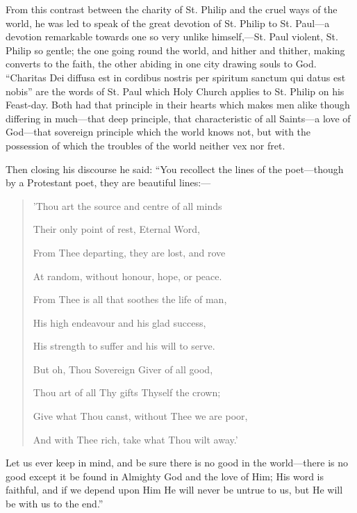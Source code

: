 From this contrast between the charity of St. Philip and the cruel
ways of the world, he was led to speak of the great devotion of St.
Philip to St. Paul—a devotion remarkable towards one so very unlike
himself,—St. Paul violent, St. Philip so gentle; the one going round
the world, and hither and thither, making converts to the faith, the
other abiding in one city drawing souls to God. ``Charitas Dei
diffusa est in cordibus nostris per spiritum sanctum qui datus est
nobis'' are the words of St. Paul which Holy Church applies to St.
Philip on his Feast-day. Both had that principle in their hearts which
makes men alike though differing in much—that deep principle, that
characteristic of all Saints—a love of God—that sovereign
principle which the world knows not, but with the possession of which
the troubles of the world neither vex nor fret.

Then closing his discourse he said: ``You recollect the lines
of the poet—though by a Protestant poet, they are beautiful lines:—

\begin{quote}

'Thou art the source and centre of all minds

Their only point of rest, Eternal Word,

From Thee departing, they are lost, and rove

At random, without honour, hope, or peace.

From Thee is all that soothes the life of man,

His high endeavour and his glad success,

His strength to suffer and his will to serve.

But oh, Thou Sovereign Giver of all good,

Thou art of all Thy gifts Thyself the crown;

Give what Thou canst, without Thee we are poor,

And with Thee rich, take what Thou wilt away.'

\end{quote}

Let us ever keep in mind, and be sure there is no good in the world—there
is no good except it be found in Almighty God and the love of Him; His
word is faithful, and if we depend upon Him He will never be untrue to
us, but He will be with us to the end.''


